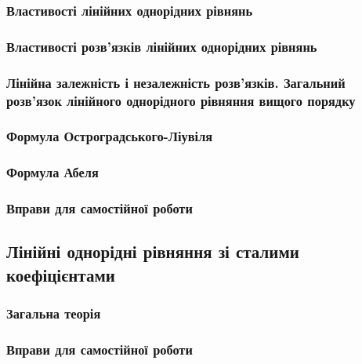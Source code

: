 		\subsubsection{Властивості лінійних однорідних рівнянь}
		

		\subsubsection{Властивості роз\-в'яз\-ків лінійних однорідних рівнянь}
		

		\subsubsection{Лінійна залежність і незалежність роз\-в'яз\-ків. Загальний роз\-в'яз\-ок лінійного однорідного рівняння вищого порядку}
		

		\subsubsection{Формула Остроградського-Ліувіля}
		

		\subsubsection{Формула Абеля}
		

		\subsubsection{Вправи для самостійної роботи}
		

	\subsection{Лінійні однорідні рівняння зі сталими коефіцієнтами}
	
		\subsubsection{Загальна теорія}
		

		\subsubsection{Вправи для самостійної роботи}
		

